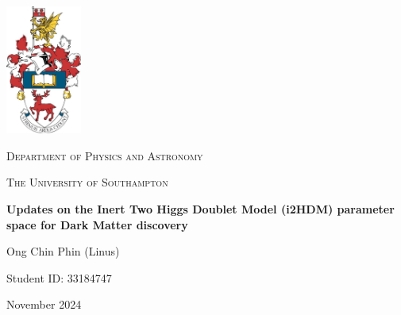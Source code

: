 \documentclass[12pt]{article}
\begin{document}
\titleformat{\section}{\large\bfseries}{\thesection}{0.5em}{}

\titleformat{\subsection}{\large\bfseries}{\thesubsection}{1em}{}

\begin{titlepage}
    \centering
    \includegraphics[width=2.5cm]{crest.jpg}\par
    \vspace{0.5cm}
    {\scshape\Large Department of Physics and Astronomy \par}
    \vspace{0.25cm}
    {\scshape\Large The University of Southampton \par}
    \vspace{1cm}
    {\huge\bfseries Updates on the Inert Two Higgs Doublet Model (i2HDM) parameter space for Dark Matter discovery\par}
    \vspace{1cm}
    {\Large Ong Chin Phin (Linus) \par}
    \vspace{0.25cm}
    {\large Student ID: 33184747 \par}
    \vfill
    {\large November 2024 \par}
\end{titlepage}

\newpage
\tableofcontents
\thispagestyle{empty}
\end{document}
